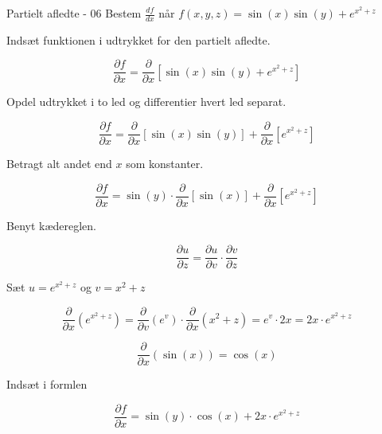 \documentclass{article}
\begin{document}
\begin{exercise}{Partielt afledte - 06}
Bestem $\frac{df}{dx}$ når $f(x,y,z) = \sin(x)\sin(y) + e^{x^2 + z}$


\hint
Indsæt funktionen i udtrykket for den partielt afledte.

\hint

\[
\frac{\partial f}{\partial x} = \frac{\partial }{\partial x} \left[ \sin(x)\sin(y) + e^{x^2 + z} \right]
\]

\hint
Opdel udtrykket i to led og differentier hvert led separat.

\hint
\[
\frac{\partial f}{\partial x} = \frac{\partial }{\partial x} \left[ \sin(x)\sin(y)\right] + \frac{\partial }{\partial x} \left[ e^{x^2 + z} \right]
\]

\hint
Betragt alt andet end $x$ som konstanter.

\hint
\[
\frac{\partial f}{\partial x} = \sin(y) \cdot \frac{\partial }{\partial x} \left[ \sin(x)\right] + \frac{\partial }{\partial x} \left[ e^{x^2 + z} \right]
\]

\hint
Benyt kædereglen.

\hint
\[
\frac{\partial u}{\partial z} = \frac{\partial u}{\partial v} \cdot \frac{\partial v}{\partial z}
\]

\hint
Sæt $u=e^{x^2 + z}$ og $v = x^2 + z$

\hint
\[
\frac{\partial}{\partial x} \left( e^{x^2 + z}\right) = \frac{\partial}{\partial v} \left( e^{v} \right) \cdot \frac{\partial}{\partial x} (x^2 + z) = e^{v} \cdot 2x = 2x \cdot e^{x^2 + z}
\]

\hint
\[
\frac{\partial}{\partial x} \left(\sin(x) \right) = \cos(x)
\]

\hint
Indsæt i formlen

\hint
\[
\frac{\partial f}{\partial x} = \sin(y) \cdot \cos(x) +2x\cdot e^{x^2 + z}
\]




\end{exercise}

\newpage
\end{document}
